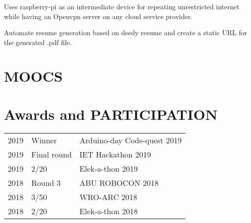 \documentclass[]{deedy-resume-openfont}
\begin{document}
\begin{minipage}[t][18cm]{0.66\textwidth}
Uses raspberry-pi as an intermediate device for repeating unrestricted internet while having an Openvpn server on any cloud service provider.
\sectionsep

Automate resume generation based on deedy resume and create a static URL for the generated .pdf file.
\sectionsep


\section{MOOCS}
\sectionsep

\section{Awards and PARTICIPATION} 
\begin{tabular}{rll}
2019	     & Winner  & Arduino-day Code-quest 2019\\
2019	     & Final round  & IET Hackathon 2019\\
2019	     & 2/20  & Elek-a-thon 2019\\
2018	     & Round 3  & ABU ROBOCON 2018\\
2018	     & 3/50  & WRO-ARC 2018\\
2018	     & 2/20  & Elek-a-thon 2018\\
\end{tabular}
\sectionsep


% 
% 

\end{minipage} 
\end{document}
